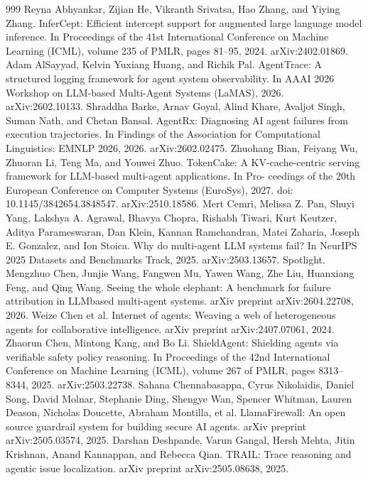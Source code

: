 \documentclass[preprint,12pt]{elsarticle}
\begin{document}
\begin{thebibliography}{999}
 Reyna Abhyankar, Zijian He, Vikranth Srivatsa, Hao Zhang, and Yiying Zhang. InferCept: Efficient intercept support for augmented large language model inference. In Proceedings of the 41st International Conference on Machine Learning (ICML), volume 235 of PMLR, pages 81--95, 2024. arXiv:2402.01869.
 Adam AlSayyad, Kelvin Yuxiang Huang, and Richik Pal. AgentTrace: A structured logging framework for agent system observability. In AAAI 2026 Workshop on LLM-based Multi-Agent Systems (LaMAS), 2026. arXiv:2602.10133.
 Shraddha Barke, Arnav Goyal, Alind Khare, Avaljot Singh, Suman Nath, and Chetan Bansal. AgentRx: Diagnosing AI agent failures from execution trajectories. In Findings of the Association for Computational Linguistics: EMNLP 2026, 2026. arXiv:2602.02475.
 Zhuohang Bian, Feiyang Wu, Zhuoran Li, Teng Ma, and Youwei Zhuo. TokenCake: A KV-cache-centric serving framework for LLM-based multi-agent applications. In Pro- ceedings of the 20th European Conference on Computer Systems (EuroSys), 2027. doi: 10.1145/3842654.3848547. arXiv:2510.18586.
 Mert Cemri, Melissa Z. Pan, Shuyi Yang, Lakshya A. Agrawal, Bhavya Chopra, Rishabh Tiwari, Kurt Keutzer, Aditya Parameswaran, Dan Klein, Kannan Ramchandran, Matei Zaharia, Joseph E. Gonzalez, and Ion Stoica. Why do multi-agent LLM systems fail? In NeurIPS 2025 Datasets and Benchmarks Track, 2025. arXiv:2503.13657. Spotlight.
 Mengzhuo Chen, Junjie Wang, Fangwen Mu, Yawen Wang, Zhe Liu, Huanxiang Feng, and Qing Wang. Seeing the whole elephant: A benchmark for failure attribution in LLMbased multi-agent systems. arXiv preprint arXiv:2604.22708, 2026.
 Weize Chen et al. Internet of agents: Weaving a web of heterogeneous agents for collaborative intelligence. arXiv preprint arXiv:2407.07061, 2024.
 Zhaorun Chen, Mintong Kang, and Bo Li. ShieldAgent: Shielding agents via verifiable safety policy reasoning. In Proceedings of the 42nd International Conference on Machine Learning (ICML), volume 267 of PMLR, pages 8313--8344, 2025. arXiv:2503.22738.
 Sahana Chennabasappa, Cyrus Nikolaidis, Daniel Song, David Molnar, Stephanie Ding, Shengye Wan, Spencer Whitman, Lauren Deason, Nicholas Doucette, Abraham Montilla, et al. LlamaFirewall: An open source guardrail system for building secure AI agents. arXiv preprint arXiv:2505.03574, 2025.
 Darshan Deshpande, Varun Gangal, Hersh Mehta, Jitin Krishnan, Anand Kannappan, and Rebecca Qian. TRAIL: Trace reasoning and agentic issue localization. arXiv preprint arXiv:2505.08638, 2025.

\end{thebibliography}
\end{document}
